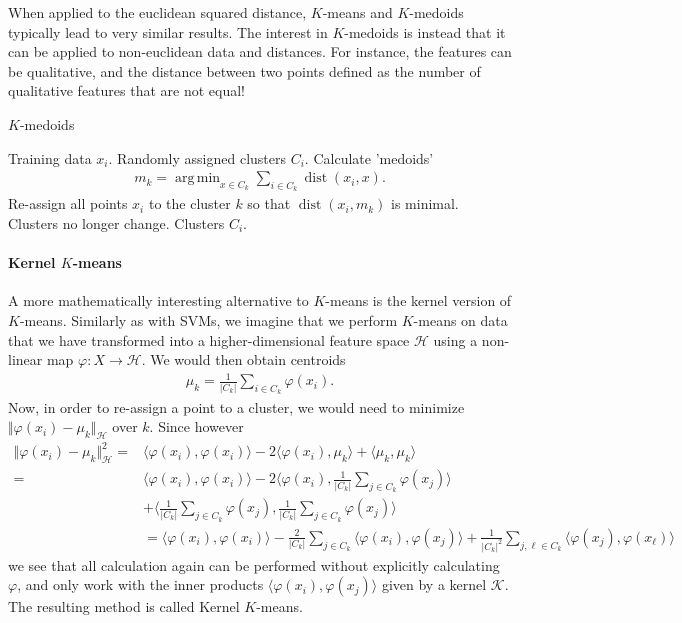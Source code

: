 \documentclass{article}
\DeclareMathOperator*{\argmin}{arg\,min}
\newcommand{\calH}{\mathcal{H}}
\newcommand{\sprod}[1]{\langle #1 \rangle}
\newcommand{\abs}[1]{\vert #1 \vert}
\newcommand{\norm}[1]{\Vert #1 \Vert}
\DeclareMathOperator{\dist}{dist}
\begin{document}
When applied to the euclidean squared distance, $K$-means and $K$-medoids typically lead to very similar results. The interest in $K$-medoids is instead that it can be applied to non-euclidean data and distances. For instance, the features can be qualitative, and the distance between two points defined as the number of qualitative features that are not equal!


\begin{algorithm}[tb]      
	\caption{$K$-medoids} 
	\label{alg:kmedoids}
	\begin{algorithmic} [1]
 		\REQUIRE Training data $x_i$.
 		\STATE Randomly assigned clusters $C_i$.
 		\REPEAT
 			\STATE Calculate 'medoids'
            \begin{align*}
                m_k = \argmin_{x \in C_k} \sum_{i\in C_k} \dist(x_i,x).
            \end{align*}
            \STATE Re-assign all points $x_i$ to the cluster $k$ so that $\dist(x_i,m_k)$ is minimal.
 		\UNTIL Clusters no longer change.
 		\RETURN Clusters $C_i$.
	\end{algorithmic}
\end{algorithm}

\paragraph{Kernel $K$-means} A more mathematically interesting alternative to $K$-means is the kernel version of $K$-means. Similarly as with SVMs, we imagine that we perform $K$-means on data that we have transformed into a higher-dimensional feature space $\calH$ using a non-linear map $\varphi:X \to \calH$. We would then obtain centroids
\begin{align*}
    \mu_k = \frac{1}{\abs{C_k}}\sum_{i \in C_k} \varphi(x_i).
\end{align*}
Now, in order to re-assign a point to a cluster, we would need to minimize $\norm{\varphi(x_i)-\mu_k}_\calH$ over $k$. Since however
\begin{align*}
    \norm{\varphi(x_i)-\mu_k}_\calH^2 =& \sprod{\varphi(x_i),\varphi(x_i)} - 2 \sprod{\varphi(x_i), \mu_k} + \sprod{\mu_k,\mu_k} \\
     =&  \sprod{\varphi(x_i),\varphi(x_i)} - 2 \sprod{ \varphi(x_i), \frac{1}{\abs{C_k}}\sum_{j \in C_k} \varphi(x_j)} \\
    &+ \sprod{\frac{1}{\abs{C_k}}\sum_{j \in C_k} \varphi(x_j),\frac{1}{\abs{C_k}}\sum_{j \in C_k} \varphi(x_j)} \\
    &= \sprod{\varphi(x_i),\varphi(x_i)} - \frac{2}{\abs{C_k}}\sum_{j \in C_k} \sprod{\varphi(x_i),\varphi(x_j)} + \frac{1}{\abs{C_k}^2} \sum_{j,\ell\in C_k} \sprod{\varphi(x_j),\varphi(x_\ell)}
\end{align*}
we see that all calculation again can be performed without explicitly calculating $\varphi$, and only work with the inner products $\sprod{\varphi(x_i),\varphi(x_j)}$ given by a kernel $\mathcal{K}$. The resulting method is called Kernel $K$-means.
\end{document}
